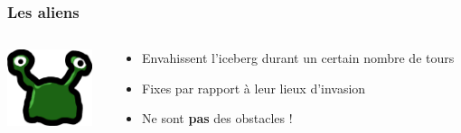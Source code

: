 \documentclass{beamer}
\begin{document}
\begin{frame}
    \frametitle{Les aliens}
    \begin{columns}[T]
        \begin{column}{.2\textwidth}
            \includegraphics[width=2.5cm]{../img/alien_big}
        \end{column}
        \begin{column}{.8\textwidth}
            \begin{itemize}
                \item Envahissent l'iceberg durant un certain nombre de tours
                \item Fixes par rapport à leur lieux d'invasion
                \item Ne sont \textbf{pas} des obstacles !
            \end{itemize}
        \end{column}
    \end{columns}
\end{frame}
\end{document}
